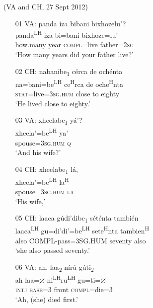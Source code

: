 \ea (VA and CH, 27 Sept 2012)
\begin{itemize}
\item[01 VA:]
\glll panda \'{i}za bibani bixhozelu'? \\               
panda\textsuperscript{LH} iza bi=bani bixhoze=lu' \\
how.many year \textsc{compl}=live father=\textsc{2sg} \\
\glt `How many years did your father live?'
 

\item[02 CH:]
\glll nabanibe\textsubscript{1} c\'{e}rca de och\'{e}nta \\   
na=bani=be\textsuperscript{LH} ce\textsuperscript{H}rca de oche\textsuperscript{H}nta \\
\textsc{stat}=live=\textsc{3sg.hum} close to eighty \\
\glt `He lived close to eighty.'


\item[03 VA:]
\glll xheelabe\textsubscript{1} y\'{a}'? \\
xheela'=be\textsuperscript{LH} ya' \\
spouse=\textsc{3sg.hum} \textsc{q} \\
\glt `And his wife?'


\item[04 CH:]
\glll xheelabe\textsubscript{1} l\'{a}, \\
xheela'=be\textsuperscript{LH} la\textsuperscript{H} \\
spouse=\textsc{3sg.hum} \textsc{la}	\\
\glt `His wife,'


\item[05 CH:]
\glll laaca g\'{u}di'dibe\textsubscript{1} s\'{e}t\'{e}nta tambi\'{e}n \\
laaca\textsuperscript{LH} gu=di'di'=be\textsuperscript{LH} sete\textsuperscript{H}nta tambien\textsuperscript{H}  \\
also	COMPL-pass=3SG.HUM seventy also \\
\glt `she also passed seventy.'


\item[06 VA:]
\glll ah, laa\textsubscript{2} n\'{i}r\'{u} g\'{u}ti\textsubscript{2}  \\
ah laa={$\varnothing$} ni\textsuperscript{LH}ru\textsuperscript{LH} gu=ti={$\varnothing$}  \\
\textsc{intj} \textsc{base}=\textsc{3} front \textsc{compl}=die=\textsc{3}  \\
\glt `Ah, (she) died first.'



\end{itemize}
